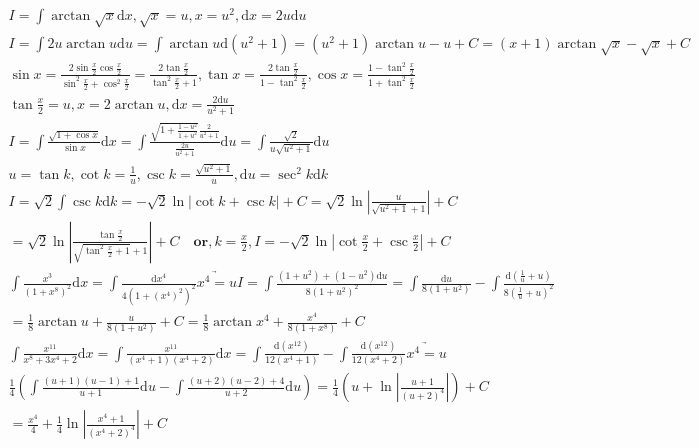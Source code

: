\documentclass{article}
\begin{document}
\clearpage
\begin{align*} 
    I = \int \arctan \sqrt{x} \mathrm{d}x , \sqrt{x} = u ,x = u^2 , \mathrm{d}x = 2u\mathrm{d}u \\
    I = \int 2u\arctan u \mathrm{d}u = \int \arctan u \mathrm{d}(u^2+1) = (u^2+1)\arctan u - u + C = (x+1)\arctan\sqrt{x} - \sqrt{x} + C\\
    \sin x = \frac{2\sin \frac{x}{2}\cos \frac{x}{2}}{\sin^2 \frac{x}{2} + \cos^2 \frac{x}{2}} = \frac{2\tan \frac{x}{2}}{\tan^2 \frac{x}{2} + 1} ,\tan x = \frac{2\tan \frac{x}{2}}{1 - \tan^2 \frac{x}{2}} , \cos x = \frac{1-\tan^2 \frac{x}{2}}{1+ \tan^2 \frac{x}{2}} \\
    \tan \frac{x}{2} = u , x = 2\arctan u ,\mathrm{d}x = \frac{2\mathrm{d}u}{u^2+1}\\
    I = \int \frac{\sqrt{1+\cos x}}{\sin x}\mathrm{d}x = \int \frac{\sqrt{1+\frac{1-u^2}{1+u^2}}\frac{2}{u^2+1}}{\frac{2u}{u^2+1}}\mathrm{d}u = \int \frac{\sqrt{2}}{u\sqrt{u^2+1}}\mathrm{d}u \\
    u = \tan k ,\cot k = \frac{1}{u} , \csc k = \frac{\sqrt{u^2+1}}{u} , \mathrm{d} u = \sec^2 k \mathrm{d} k \\
    I = \sqrt{2} \int \csc k \mathrm{d} k = -\sqrt{2}\ln|\cot k + \csc k| + C = \sqrt{2}\ln\left|\frac{u}{\sqrt{u^2+1}+1}\right| + C \\
    = \sqrt{2} \ln \left| \frac{\tan \frac{x}{2}}{\sqrt{\tan^2 \frac{x}{2}+1} + 1}\right| + C \quad \bm{or} ,k =\frac{x}{2} , I = -\sqrt{2}\ln\left|\cot \frac{x}{2} + \csc \frac{x}{2}\right| + C \\
    \int \frac{x^3}{(1+x^8)^2}\mathrm{d}x = \int \frac{\mathrm{d}x^4}{4(1+(x^4)^2)^2} \underrightarrow{x^4 = u} I = \int \frac{(1+u^2)+(1-u^2)\mathrm{d}u}{8(1+u^2)^2} = \int \frac{\mathrm{d}u}{8(1+u^2)} - \int \frac{\mathrm{d}(\frac{1}{u}+u)}{8(\frac{1}{u}+u)^2} \\
    = \frac{1}{8}\arctan u + \frac{u}{8(1+u^2)} + C = \frac{1}{8}\arctan x^4 + \frac{x^4}{8(1+x^8)} + C \\
    \int \frac{x^{11}}{x^8+3x^4+2} \mathrm{d}x = \int \frac{x^{11}}{(x^4+1)(x^4+2)}\mathrm{d}x = \int \frac{\mathrm{d}(x^{12})}{12(x^4+1)} - \int \frac{\mathrm{d}(x^{12})}{12(x^4+2)} \underrightarrow{x^4 = u} \\ 
    \frac{1}{4}\left(\int \frac{(u+1)(u-1)+1 }{u+1}\mathrm{d}u - \int \frac{(u+2)(u-2)+4}{u+2}\mathrm{d}u\right) = \frac{1}{4}\left( u + \ln\left| \frac{u+1}{(u+2)^4}\right|\right) + C \\ 
    = \frac{x^4}{4} + \frac{1}{4}\ln\left|\frac{x^4+1}{(x^4+2)^4}\right| + C \\

\end{align*}
\end{document}
